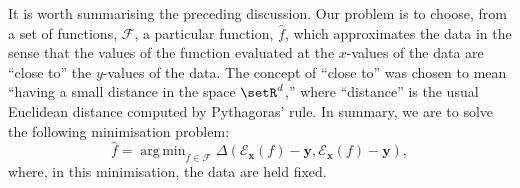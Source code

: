\documentclass[10pt, a4paper]{article}
\DeclareMathOperator*{\argmin}{arg\,min}
\begin{document}
It is worth summarising the preceding discussion. Our problem is to
choose, from a set of functions, $\mathcal{F}$, a particular function,
$\hat{f}$, which approximates the data in the sense that the values of
the function evaluated at the $x$-values of the data are “close to”
the $y$-values of the data. The concept of “close to” was chosen to
mean “having a small distance in the space $\setR^d$,” where
“distance” is the usual Euclidean distance computed by Pythagoras'
rule. In summary, we are to solve the following minimisation problem:
\begin{equation}
  \label{eq:least-squares-loss}
  \hat{f} = \argmin_{f\in\mathcal{F}} \Delta(\mathcal{E}_{\bm{x}}(f) - \bm{y}, \mathcal{E}_{\bm{x}}(f) - \bm{y}),
\end{equation}
where, in this minimisation, the data are held fixed.
\end{document}
